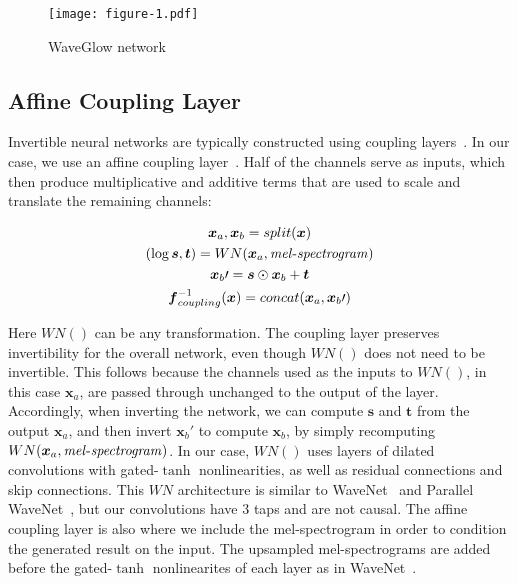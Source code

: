 \begin{figure}[!ht]
    \centering
    \texttt{[image: figure-1.pdf]}
    \caption{WaveGlow network}
    \label{fig:network_diagram}
\end{figure}
\subsection{Affine Coupling Layer}
Invertible neural networks are typically constructed using coupling layers~\cite{dinh2014nice, dinh2016density, kingma2018glow}.  In our case, we use an affine coupling layer~\cite{dinh2016density}.  Half of the channels serve as inputs, which then produce multiplicative and additive terms that are used to scale and translate the remaining channels:  

\begin{gather}
\boldsymbol{x}_a, \boldsymbol{x}_b =  split(\boldsymbol{x}) \\
(\log \boldsymbol{s}, \boldsymbol{t}) = WN(\boldsymbol{x}_a, \mathit{mel\textnormal{-}spectrogram}) \\
\boldsymbol{x}_b\prime = \boldsymbol{s} \odot \boldsymbol{x}_b + \boldsymbol{t} \\
\boldsymbol{f}_{coupling}^{-1}(\boldsymbol{x}) = concat(\boldsymbol{x}_a, \boldsymbol{x}_b\prime)
\end{gather}

Here $WN()$ can be any transformation.  The coupling layer preserves invertibility for the overall network, even though $WN()$ does not need to be invertible. This follows because the channels used as the inputs to $WN()$, in this case $\boldsymbol{x}_a$, are passed through unchanged to the output of the layer. Accordingly, when inverting the network, we can compute $\boldsymbol{s}$ and $\boldsymbol{t}$ from the output $\boldsymbol{x}_a$, and then invert $\boldsymbol{x}_b\prime$ to compute $\boldsymbol{x}_b$, by simply recomputing $WN(\boldsymbol{x}_a, \mathit{mel\textnormal{-}spectrogram})$. In our case, $WN()$ uses layers of dilated convolutions with gated-$\tanh$ nonlinearities, as well as residual connections and skip connections.  This $WN$ architecture is similar to WaveNet~\cite{van2016wavenet} and Parallel WaveNet~\cite{van2018parallel}, but our convolutions have 3 taps and are not causal.  The affine coupling layer is also where we include the mel-spectrogram in order to condition the generated result on the input.  The upsampled mel-spectrograms are added before the gated-$\tanh$ nonlinearites of each layer as in WaveNet~\cite{van2016wavenet}.

